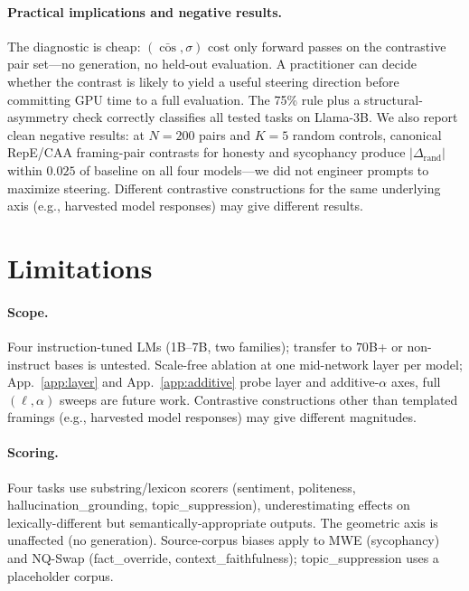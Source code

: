 \documentclass{article}
\begin{document}
\paragraph{Practical implications and negative results.}
The diagnostic is cheap: $(\bar{\cos}, \sigma)$ cost only forward
passes on the contrastive pair set---no generation, no held-out
evaluation. A practitioner can decide whether the contrast is
likely to yield a useful steering direction before committing GPU
time to a full evaluation. The 75\% rule plus a structural-asymmetry
check correctly classifies all tested tasks on Llama-3B. We also
report clean negative results: at $N{=}200$ pairs and $K{=}5$ random
controls, canonical RepE/CAA framing-pair contrasts for honesty and
sycophancy produce $|\Delta_{\text{rand}}|$ within $0.025$ of
baseline on all four models---we did not engineer prompts to maximize
steering. Different contrastive constructions for the same underlying
axis (e.g., harvested model responses) may give different results.

\section{Limitations}

\paragraph{Scope.} Four instruction-tuned LMs (1B--7B, two
families); transfer to $70$B+ or non-instruct bases is untested.
Scale-free ablation at one mid-network layer per model;
App.~\ref{app:layer} and App.~\ref{app:additive} probe layer and
additive-$\alpha$ axes, full $(\ell, \alpha)$ sweeps are future
work. Contrastive constructions other than templated framings
(e.g., harvested model responses) may give different magnitudes.

\paragraph{Scoring.} Four tasks use substring/lexicon scorers
(sentiment, politeness, hallucination\_grounding, topic\_suppression),
underestimating effects on lexically-different but
semantically-appropriate outputs. The geometric axis is unaffected
(no generation). Source-corpus biases apply to MWE (sycophancy) and
NQ-Swap (fact\_override, context\_faithfulness); topic\_suppression
uses a placeholder corpus.
\end{document}
